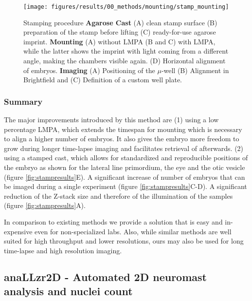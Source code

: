 \documentclass[11pt,singlespacinge,twoside]{reedthesis} %
\theoremstyle{definition}
\theoremstyle{definition}
\theoremstyle{definition}
\theoremstyle{remark}
\begin{document}
\begin{figure}[H]

{\centering \texttt{[image: figures/results/00\_methods/mounting/stamp\_mounting]} 

}

\caption[Stamping procedure]{Stamping procedure \textbf{Agarose Cast} (A) clean stamp surface (B) preparation of the stamp before lifting (C) ready-for-use agarose imprint. \textbf{Mounting} (A) without LMPA (B and C) with LMPA, while the latter shows the imprint with light coming from a different angle, making the chambers visible again. (D) Horizontal alignment of embryos. \textbf{Imaging} (A) Positioning of the \(\mu\)-well (B) Alignment in Brightfield and (C) Definition of a custom well plate.}\label{fig:mounting}
\end{figure}
\hypertarget{summary-1}{%
\subsubsection{Summary}\label{summary-1}}

The major improvements introduced by this method are (1) using a low percentage LMPA, which extends the timespan for mounting which is necessary to align a higher number of embryos. It also gives the embryo more freedom to grow during longer time-lapse imaging and facilitates retrieval of afterwards. (2) using a stamped cast, which allows for standardized and reproducible positions of the embryo as shown for the lateral line primordium, the eye and the otic vesicle (figure \ref{fig:stampresults}E). A significant increase of number of embryos that can be imaged during a single experiment (figure \ref{fig:stampresults}C-D). A significant reduction of the Z-stack size and therefore of the illumination of the samples (figure \ref{fig:stampresults}A).

In comparison to existing methods we provide a solution that is easy and in-expensive even for non-specialized labs. Also, while similar methods are well suited for high throughput and lower resolutions, ours may also be used for long time-lapse and high resolution imaging.

\hypertarget{mat-anallzr2d}{%
\subsection{anaLLzr2D - Automated 2D neuromast analysis and nuclei count}\label{mat-anallzr2d}}
\end{document}
